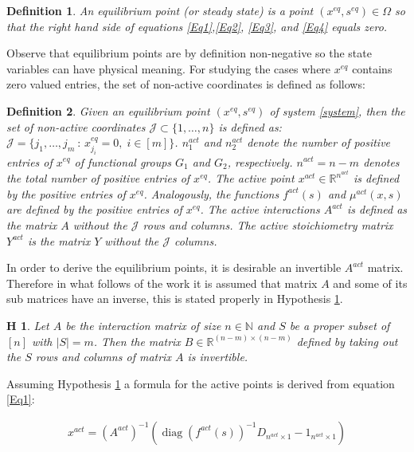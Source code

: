 \documentclass[3p,times]{article}
\newcommand{\N}{\mathbb{N}}
\newcommand{\R}{\mathbb{R}}
\DeclareMathOperator{\diag}{diag}
\newtheorem{defn}{Definition}
\newtheorem{hypo}{H}
\begin{document}
\begin{defn} 
	An equilibrium point (or steady state) is a point $(x^{eq},s^{eq}) \in \Omega$ so that the right hand side of equations \eqref{Eq1},\eqref{Eq2}, \eqref{Eq3}, and \eqref{Eq4} equals zero. 
\end{defn} 

Observe that equilibrium points are by definition non-negative so the state variables can have physical meaning. For studying the cases where $x^{eq}$ contains zero valued entries, the set of non-active coordinates is defined as follows:

\begin{defn}
	Given an equilibrium point $(x^{eq},s^{eq})$ of system \eqref{system}, then the set of non-active coordinates $\mathcal{J}\subset \{1,\dots,n\}$ is defined as:
	$\mathcal{J} = \{j_1, \dots, j_m\ : \, x^{eq}_{j_i} = 0 , \;i \in [m] \} $. $n_1^{act}$ and $n_2^{act}$ denote the number of positive entries of $x^{eq}$ of functional groups $G_1$ and $G_2$, respectively. $n^{act} = n-m$ denotes the total number of positive entries of $x^{eq}$. The active point $x^{act}\in \R^{n^{act}}$ is defined by the positive entries of $x^{eq}$. Analogously, the functions $f^{act}(s)$ and $\mu^{act}(x,s)$ are defined by the positive entries of $x^{eq}$. The active interactions $A^{act}$ is defined as the matrix $A$ without the $\mathcal{J}$ rows and columns. The active stoichiometry matrix $Y^{act}$ is the matrix $Y$ without the $\mathcal{J}$ columns. 
\end{defn}
 
 In order to derive the equilibrium points, it is desirable an invertible $A^{act}$ matrix. Therefore in what follows of the work it is assumed that matrix $A$ and some of its sub matrices have an inverse, this is stated properly in Hypothesis \ref{inverse hypothesis}. 

\begin{hypo}
	Let $A$ be the interaction matrix of size $n \in \N$ and $S$ be a proper subset of $[n]$ with $|S| = m$. Then the matrix $B \in \R^{(n-m) \times (n-m)}$ defined by taking out the $S$ rows and columns of matrix $A$ is invertible.
	\label{inverse hypothesis}
\end{hypo} 

Assuming Hypothesis \ref{inverse hypothesis} a formula for the active points is derived from equation \eqref{Eq1}:

\begin{align}
\label{EqSome}x^{act} = (A^{act})^{-1}(\diag(f^{act}(s))^{-1}D_{n^{act}\times 1} - 1_{n^{act}\times 1})
\end{align} 
\end{document}
